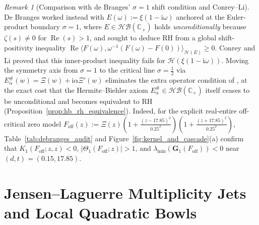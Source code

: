 \documentclass[11pt,reqno]{amsart}
\theoremstyle{definition}
\theoremstyle{remark}
\newtheorem{remark}[theorem]{Remark}
\numberwithin{equation}{section}
\newcommand{\ii}{\mathrm{i}}
\newcommand{\Rea}{\operatorname{Re}}
\begin{document}
\begin{remark}[Comparison with de Branges' $\sigma = 1$ shift condition and Conrey--Li]\label{rem:conrey_li_comparison}
De Branges \cite{deBranges1986} worked instead with $E(\omega) := \xi(1 - \ii\omega)$ anchored at the Euler-product boundary $\sigma = 1$, where $E \in \mathcal{HB}(\mathbb{C}_+)$ holds \emph{unconditionally} because $\zeta(s) \neq 0$ for $\Rea(s) > 1$, and sought to deduce RH from a global shift-positivity inequality $\Rea\langle F(\omega), \omega^{-1}(F(\omega)-F(0))\rangle_{\mathcal{H}(E)} \ge 0$. Conrey and Li \cite{ConreyLi2000} proved that this inner-product inequality fails for $\mathcal{H}(\xi(1-\ii\omega))$. Moving the symmetry axis from $\sigma = 1$ to the critical line $\sigma = \frac{1}{2}$ via $E_\alpha^\#(w) = \Xi(w) + \ii\alpha\Xi'(w)$ eliminates the extra operator condition of \cite{ConreyLi2000}, at the exact cost that the Hermite--Biehler axiom $E_\alpha^\# \in \mathcal{HB}(\mathbb{C}_+)$ itself ceases to be unconditional and becomes equivalent to RH (Proposition~\ref{prop:hb_rh_equivalence}). Indeed, for the explicit real-entire off-critical zero model $F_{\mathrm{off}}(z) := \Xi(z)(1 + \frac{(z-17.85)^2}{0.25^2})(1 + \frac{(z+17.85)^2}{0.25^2})$, Table~\ref{tab:debranges_audit} and Figure~\ref{fig:kernel_and_cascade}(a) confirm that $K_1(F_{\mathrm{off}}; z, z) < 0$, $\lvert\Theta_1(F_{\mathrm{off}}; z)\rvert > 1$, and $\lambda_{\min}(\mathbf{G}_1(F_{\mathrm{off}})) < 0$ near $(d,t) = (0.15, 17.85)$.
\end{remark}

\section{Jensen--Laguerre Multiplicity Jets and Local Quadratic Bowls}\label{sec:lehmer_cascade}
\end{document}
